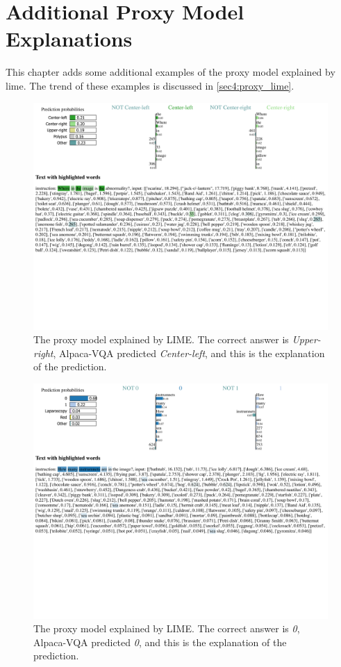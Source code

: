 \chapter{Additional Proxy Model Explanations}
\label{appendix:proxy}
This chapter adds some additional examples of the proxy model explained by \gls{lime}.
The trend of these examples is discussed in \autoref{sec4:proxy_lime}.

\begin{figure}[htb]
    \centerline{
    \includegraphics[width=1.3\textwidth]{images/LIME_0.pdf}}
    \caption[The proxy model explained by LIME - 1.]{The proxy model explained by LIME. The correct answer is \textit{Upper-right}, Alpaca-VQA predicted \textit{Center-left}, and this is the explanation of the prediction.}
    \label{fig:appendix_lime_0}
\end{figure} 


\begin{figure}[htb]
    \centerline{
    \includegraphics[width=1.3\textwidth]{images/LIME_1.pdf}}
    \caption[The proxy model explained by LIME - 2.]{The proxy model explained by LIME. The correct answer is \textit{0}, Alpaca-VQA predicted \textit{0}, and this is the explanation of the prediction.}
    \label{fig:appendix_lime_1}
\end{figure} 

